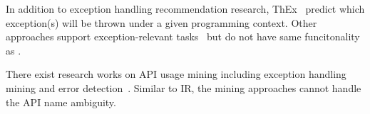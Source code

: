 In addition to exception handling recommendation research,
ThEx~\cite{throw-ase22} predict which exception(s) will be thrown
under a given programming context. Other approaches support
exception-relevant tasks~\cite{8595064,9462986,9700190} but do not
have same funcitonality as {\tool}.

There exist research works on API usage mining including exception
handling mining and error
detection~\cite{suresh-icse09,mithun-fase09}. Similar to IR, the
mining approaches cannot handle the API name ambiguity.



